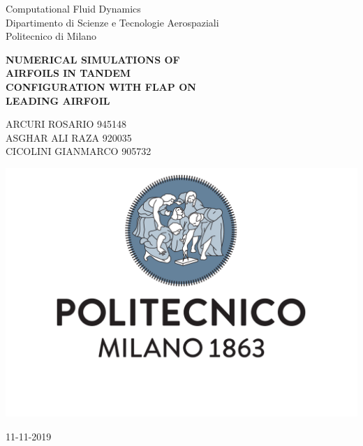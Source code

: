 \documentclass[11pt,english, openany]{book}
\begin{document}

\begin{titlepage}
	\clearpage\thispagestyle{empty}
	\centering
	\vspace{1cm}

	{\normalsize Computational Fluid Dynamics \\ 
		Dipartimento di Scienze e Tecnologie Aerospaziali \\
		Politecnico di Milano \par}
		\vspace{3cm}
	{\Huge \textbf{NUMERICAL SIMULATIONS OF\\ \vspace{0.1cm} AIRFOILS IN TANDEM\\ \vspace{0.1cm} CONFIGURATION WITH FLAP ON\\ \vspace{0.4cm} LEADING AIRFOIL}} \\
	\vspace{4cm}
	{\normalsize ARCURI ROSARIO 945148\\ %
	             ASGHAR ALI RAZA 920035\\
	             CICOLINI GIANMARCO 905732\par}
	\vspace{1cm}
    
    \centering \includegraphics[scale=0.4]{logo1.pdf}
    
    \vspace{0.5cm}
		
	{\normalsize 11-11-2019 \par}
	
	\pagebreak

\end{titlepage}
\end{document}
